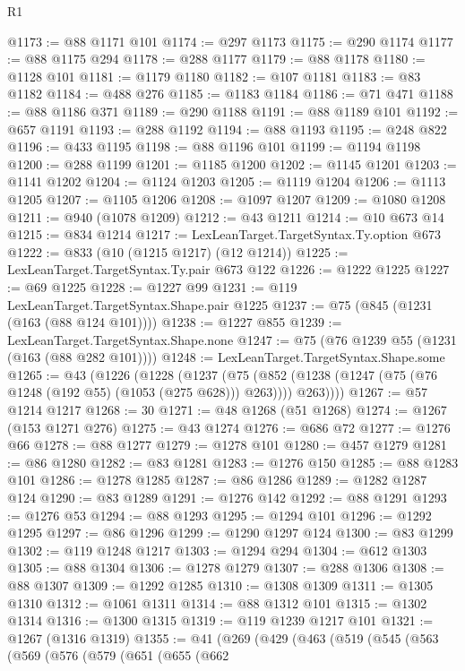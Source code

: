 \begin{lexlean}{R1}
\begin{coremodule}
@1173 := @88 @1171 @101
@1174 := @297 @1173
@1175 := @290 @1174
@1177 := @88 @1175 @294
@1178 := @288 @1177
@1179 := @88 @1178
@1180 := @1128 @101
@1181 := @1179 @1180
@1182 := @107 @1181
@1183 := @83 @1182
@1184 := @488 @276
@1185 := @1183 @1184
@1186 := @71 @471
@1188 := @88 @1186 @371
@1189 := @290 @1188
@1191 := @88 @1189 @101
@1192 := @657 @1191
@1193 := @288 @1192
@1194 := @88 @1193
@1195 := @248 @822
@1196 := @433 @1195
@1198 := @88 @1196 @101
@1199 := @1194 @1198
@1200 := @288 @1199
@1201 := @1185 @1200
@1202 := @1145 @1201
@1203 := @1141 @1202
@1204 := @1124 @1203
@1205 := @1119 @1204
@1206 := @1113 @1205
@1207 := @1105 @1206
@1208 := @1097 @1207
@1209 := @1080 @1208
@1211 := @940 (@1078 @1209)
@1212 := @43 @1211
@1214 := @10 @673 @14
@1215 := @834 @1214
@1217 := LexLeanTarget.TargetSyntax.Ty.option @673
@1222 := @833 (@10 (@1215 @1217) (@12 @1214))
@1225 := LexLeanTarget.TargetSyntax.Ty.pair @673 @122
@1226 := @1222 @1225
@1227 := @69 @1225
@1228 := @1227 @99
@1231 := @119 LexLeanTarget.TargetSyntax.Shape.pair @1225
@1237 := @75 (@845 (@1231 (@163 (@88 @124 @101))))
@1238 := @1227 @855
@1239 := LexLeanTarget.TargetSyntax.Shape.none
@1247 := @75 (@76 @1239 @55 (@1231 (@163 (@88 @282 @101))))
@1248 := LexLeanTarget.TargetSyntax.Shape.some
@1265 := @43
    (@1226
      (@1228
        (@1237
          (@75 (@852 (@1238 (@1247 (@75 (@76 @1248 (@192 @55) (@1053 (@275 @628))) @263)))) @263))))
@1267 := @57 @1214 @1217
@1268 := 30
@1271 := @48 @1268 (@51 @1268)
@1274 := @1267 (@153 @1271 @276)
@1275 := @43 @1274
@1276 := @686 @72
@1277 := @1276 @66
@1278 := @88 @1277
@1279 := @1278 @101
@1280 := @457 @1279
@1281 := @86 @1280
@1282 := @83 @1281
@1283 := @1276 @150
@1285 := @88 @1283 @101
@1286 := @1278 @1285
@1287 := @86 @1286
@1289 := @1282 @1287 @124
@1290 := @83 @1289
@1291 := @1276 @142
@1292 := @88 @1291
@1293 := @1276 @53
@1294 := @88 @1293
@1295 := @1294 @101
@1296 := @1292 @1295
@1297 := @86 @1296
@1299 := @1290 @1297 @124
@1300 := @83 @1299
@1302 := @119 @1248 @1217
@1303 := @1294 @294
@1304 := @612 @1303
@1305 := @88 @1304
@1306 := @1278 @1279
@1307 := @288 @1306
@1308 := @88 @1307
@1309 := @1292 @1285
@1310 := @1308 @1309
@1311 := @1305 @1310
@1312 := @1061 @1311
@1314 := @88 @1312 @101
@1315 := @1302 @1314
@1316 := @1300 @1315
@1319 := @119 @1239 @1217 @101
@1321 := @1267 (@1316 @1319)
@1355 := @41
    (@269
      (@429
        (@463
          (@519
            (@545
              (@563
                (@569
                  (@576
                    (@579
                      (@651
                        (@655
                          (@662

\end{coremodule}
\end{lexlean}
